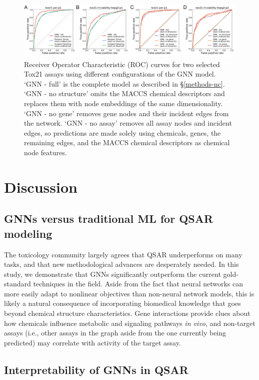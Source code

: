 \documentclass{ws-procs11x85}
\begin{document}
\begin{figure}
   \centering
   \includegraphics[width=\textwidth]{figures/figure3.pdf}
   \caption{Receiver Operator Characteristic (ROC) curves for two selected Tox21 assays using different configurations of the GNN model. `GNN - full' is the complete model as described in \S\ref{methods-nc}. `GNN - no structure' omits the MACCS chemical descriptors and replaces them with node embeddings of the same dimensionality. `GNN - no gene' removes gene nodes and their incident edges from the network. `GNN - no assay' removes all assay nodes and incident edges, so predictions are made solely using chemicals, genes, the remaining edges, and the MACCS chemical descriptors as chemical node features.}\label{fig:5}
\end{figure}

\section{Discussion}

\subsection{GNNs versus traditional ML for QSAR modeling}
The toxicology community largely agrees that QSAR underperforms on many tasks, and that new methodological advances are desperately needed.
In this study, we demonstrate that GNNs significantly outperform the current gold-standard techniques in the field.
Aside from the fact that neural networks can more easily adapt to nonlinear objectives than non-neural network models, this is likely a natural consequence of incorporating biomedical knowledge that goes beyond chemical structure characteristics.
Gene interactions provide clues about how chemicals influence metabolic and signaling pathways \textit{in vivo}, and non-target assays (i.e., other assays in the graph aside from the one currently being predicted) may correlate with activity of the target assay.

\subsection{Interpretability of GNNs in QSAR}
\end{document}
